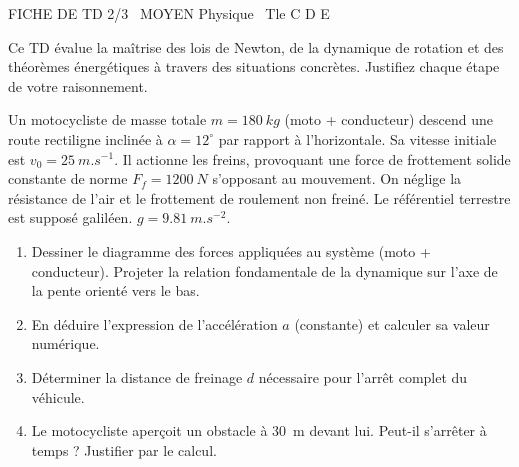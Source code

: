 \documentclass[11pt]{article}
\begin{document}
\begin{tcolorbox}[enhanced,colback=popink,colframe=popink,arc=10pt,boxrule=0pt,left=12pt,right=12pt,top=9pt,bottom=9pt]
{\color{white}\popxbold\small FICHE DE TD 2/3 \textbullet\ MOYEN \hfill Physique \textbullet\ Tle C D E\par}
\end{tcolorbox}
\vspace{4pt}
Ce TD évalue la maîtrise des lois de Newton, de la dynamique de rotation et des théorèmes énergétiques à travers des situations concrètes. Justifiez chaque étape de votre raisonnement.

\begin{exercice}
Un motocycliste de masse totale $m = \SI{180}{kg}$ (moto + conducteur) descend une route rectiligne inclinée à $\alpha = 12^\circ$ par rapport à l'horizontale. Sa vitesse initiale est $v_0 = \SI{25}{m.s^{-1}}$. Il actionne les freins, provoquant une force de frottement solide constante de norme $F_f = \SI{1200}{N}$ s'opposant au mouvement. On néglige la résistance de l'air et le frottement de roulement non freiné. Le référentiel terrestre est supposé galiléen. $g = \SI{9,81}{m.s^{-2}}$.
\begin{enumerate}
    \item Dessiner le diagramme des forces appliquées au système (moto + conducteur). Projeter la relation fondamentale de la dynamique sur l'axe de la pente orienté vers le bas.
    \item En déduire l'expression de l'accélération $a$ (constante) et calculer sa valeur numérique.
    \item Déterminer la distance de freinage $d$ nécessaire pour l'arrêt complet du véhicule.
    \item Le motocycliste aperçoit un obstacle à \SI{30}{m} devant lui. Peut-il s'arrêter à temps ? Justifier par le calcul.
\end{enumerate}
\end{exercice}
\end{document}
